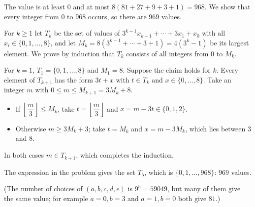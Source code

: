 The value is at least $0$ and at most $8(81+27+9+3+1)=968$. We show that every integer from $0$ to $968$ occurs, so there are $\boxed{969}$ values.

For $k\ge1$ let $T_k$ be the set of values of $3^{k-1}x_{k-1}+\cdots+3x_1+x_0$ with all $x_i\in\{0,1,\dots,8\}$, and let $M_k=8\left(3^{k-1}+\cdots+3+1\right)=4\left(3^k-1\right)$ be its largest element. We prove by induction that $T_k$ consists of all integers from $0$ to $M_k$.

For $k=1$, $T_1=\{0,1,\dots,8\}$ and $M_1=8$. Suppose the claim holds for $k$. Every element of $T_{k+1}$ has the form $3t+x$ with $t\in T_k$ and $x\in\{0,\dots,8\}$. Take an integer $m$ with $0\le m\le M_{k+1}=3M_k+8$.
\begin{itemize}
\item If $\left\lfloor\dfrac m3\right\rfloor\le M_k$, take $t=\left\lfloor\dfrac m3\right\rfloor$ and $x=m-3t\in\{0,1,2\}$.
\item Otherwise $m\ge3M_k+3$; take $t=M_k$ and $x=m-3M_k$, which lies between $3$ and $8$.
\end{itemize}
In both cases $m\in T_{k+1}$, which completes the induction.

The expression in the problem gives the set $T_5$, which is $\{0,1,\dots,968\}$: $969$ values.

(The number of choices of $(a,b,c,d,e)$ is $9^5=59049$, but many of them give the same value; for example $a=0,b=3$ and $a=1,b=0$ both give $81$.)
